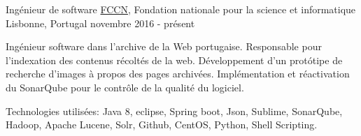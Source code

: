 


\begin{cventries}


\cventry
{Ingénieur de software} %
{\href{https://www.fccn.pt/en/}{FCCN}, Fondation nationale pour la science et informatique} %
{Lisbonne, Portugal} %
{novembre 2016 - présent} %
{ %
\begin{cvitems}
\item {Ingénieur software dans l’archive de la Web portugaise. Responsable pour l’indexation des contenus récoltés de la web. Développement d’un protótipe de recherche d’images à propos des pages archivées. Implémentation et réactivation du SonarQube pour le contrôle de la qualité du logiciel.}
\item {Technologies utilisées: Java 8, eclipse, Spring boot, Json, Sublime, SonarQube, Hadoop, Apache Lucene, Solr, Github, CentOS, Python, Shell Scripting.}
\end{cvitems}
}



\end{cventries}
